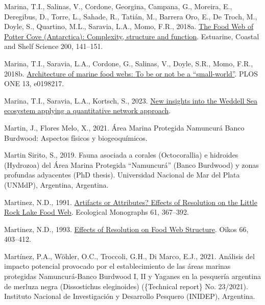 \documentclass[
]{article}
\newlength{\cslhangindent}
\newenvironment{CSLReferences}[2] %
 {\begin{list}{}{%
  \setlength{\itemindent}{0pt}
  \setlength{\leftmargin}{0pt}
  \setlength{\parsep}{0pt}
  \ifodd #1
   \setlength{\leftmargin}{\cslhangindent}
   \setlength{\itemindent}{-1\cslhangindent}
  \fi
  \setlength{\itemsep}{#2\baselineskip}}}
 {\end{list}}
\providecommand{\DIFaddend}{} %
\DeclareRobustCommand{\DIFaddend}{\DIFOaddend \let\includegraphics\DIFOincludegraphics} %
\begin{document}
\begin{CSLReferences}{1}{0}
\DIFaddend {}
Marina, T.I., Salinas, V., Cordone, Georgina, Campana, G., Moreira, E.,
Deregibus, D., Torre, L., Sahade, R., Tatián, M., Barrera Oro, E., De
Troch, M., Doyle, S., Quartino, M.L., Saravia, L.A., Momo, F.R., 2018a.
\href{https://doi.org/10.1016/j.ecss.2017.10.015}{The {Food Web} of
{Potter Cove} ({Antarctica}): Complexity, structure and function}.
Estuarine, Coastal and Shelf Science 200, 141--151.

Marina, T.I., Saravia, L.A., Cordone, G., Salinas, V., Doyle, S.R.,
Momo, F.R., 2018b.
\href{https://doi.org/10.1371/journal.pone.0198217}{Architecture of
marine food webs: {To} be or not be a {``small-world''}}. PLOS ONE 13,
e0198217.

Marina, T.I., Saravia, L.A., Kortsch, S., 2023.
\href{https://doi.org/10.5194/egusphere-2022-1518}{New insights into the
{Weddell Sea} ecosystem applying a quantitative network approach}.

Martin, J., Flores Melo, X., 2021. {{Á}rea Marina Protegida Namuncur{á}
Banco Burdwood: Aspectos f{í}sicos y biogeoqu{í}micos}.

Martin Sirito, S., 2019. {Fauna asociada a corales (Octocorallia) e
hidroides (Hydrozoa) del {Á}rea Marina Protegida {``Namuncur{á}''}
(Banco Burdwood) y zonas profundas adyacentes} (PhD thesis). Universidad
Nacional de Mar del Plata (UNMdP), Argentina, {Argentina}.

Martinez, N.D., 1991. \href{https://doi.org/10.2307/2937047}{Artifacts
or {Attributes}? {Effects} of {Resolution} on the {Little Rock Lake Food
Web}}. Ecological Monographs 61, 367--392.

Martinez, N.D., 1993. \href{https://doi.org/10.2307/3544934}{Effects of
{Resolution} on {Food Web Structure}}. Oikos 66, 403--412.

Martínez, P.A., Wöhler, O.C., Troccoli, G.H., Di Marco, E.J., 2021.
{An{á}lisis del impacto potencial provocado por el establecimiento de
las {á}reas marinas protegidas Namuncur{á}-Banco Burdwood I, II y
Yaganes en la pesquer{í}a argentina de merluza negra (Dissostichus
eleginoides)} (\{Technical report\} No. 23/2021). {Instituto Nacional de
Investigaci{ó}n y Desarrollo Pesquero (INIDEP), Argentina}.


\end{CSLReferences}
\end{document}

